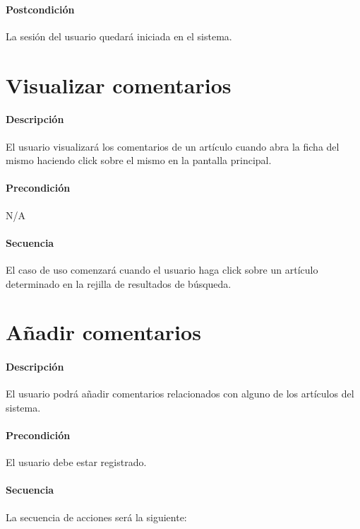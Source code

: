 \paragraph{Postcondición} La sesión del usuario quedará iniciada en el sistema.

\section{Visualizar comentarios}

\paragraph{Descripción} El usuario visualizará los comentarios de un artículo cuando abra la ficha del mismo haciendo click sobre el mismo en la pantalla principal.

\paragraph{Precondición} N/A

\paragraph{Secuencia} El caso de uso comenzará cuando el usuario haga click sobre un artículo determinado en la rejilla de resultados de búsqueda.

\section{Añadir comentarios}

\paragraph{Descripción} El usuario podrá añadir comentarios relacionados con alguno de los artículos del sistema.

\paragraph{Precondición} El usuario debe estar registrado.

\paragraph{Secuencia} La secuencia de acciones será la siguiente:

